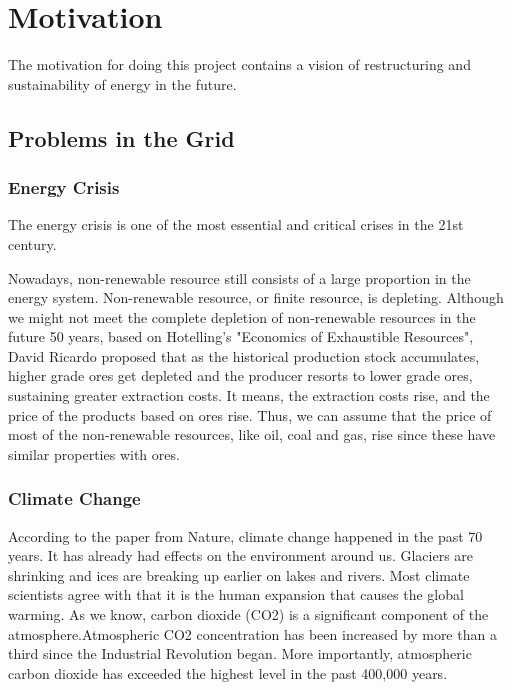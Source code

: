 \section{Motivation} %
The motivation for doing this project contains a vision of restructuring and sustainability of energy in the future.
\subsection{Problems in the Grid}
\subsubsection{Energy Crisis}
The energy crisis is one of the most essential and critical crises in the 21st century. 





Nowadays, non-renewable resource still consists of a large proportion in the energy system. Non-renewable resource, or finite resource, is depleting. Although we might not meet the complete depletion of non-renewable resources in the future 50 years, based on Hotelling’s "Economics of Exhaustible Resources", David Ricardo proposed that \cite{devarajan1981hotelling} as the historical production stock accumulates, higher grade ores get depleted and the producer resorts to lower grade ores, sustaining greater extraction costs. It means, the extraction costs rise, and the price of the products based on ores rise. Thus, we can assume that the price of most of the non-renewable resources, like oil, coal and gas, rise since these have similar properties with ores. 

\subsubsection{Climate Change}
According to the paper from Nature, climate change happened in the past 70 years. It has already had effects on the environment around us. Glaciers are shrinking and ices are breaking up earlier on lakes and rivers. Most climate scientists agree with that it is the human expansion that causes the global warming. As we know, carbon dioxide (CO2) is a significant component of the atmosphere.Atmospheric CO2 concentration has been increased by more than a third since the Industrial Revolution began. More importantly, atmospheric carbon dioxide has exceeded the highest level in the past 400,000 years. 

